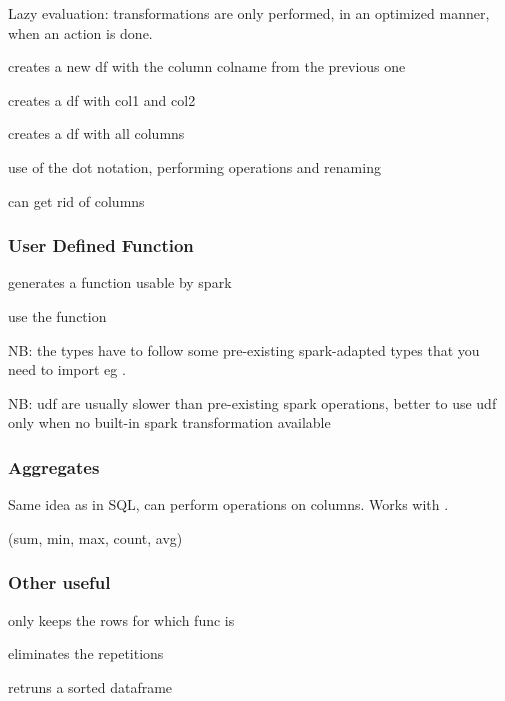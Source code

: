 			Lazy evaluation: transformations are only performed, in an optimized manner, when an action is done.

			 creates a new df with the column colname from the previous one

			 creates a df with col1 and col2

			 creates a df with all columns

			 use of the dot notation, performing operations and renaming

			 can get rid of columns

		\subsubsection{User Defined Function}

			 generates a function usable by spark

			 use the function

			NB: the types have to follow some pre-existing spark-adapted types that you need to import eg .

			NB: udf are usually slower than pre-existing spark operations, better to use udf only when no built-in spark transformation available


		\subsubsection{Aggregates}

			Same idea as in SQL, can perform operations on columns. Works with .

			\code(sum, min, max, count, avg)



		\subsubsection{Other useful}

			 only keeps the rows for which func is 

			 eliminates the repetitions

			 retruns a sorted dataframe

